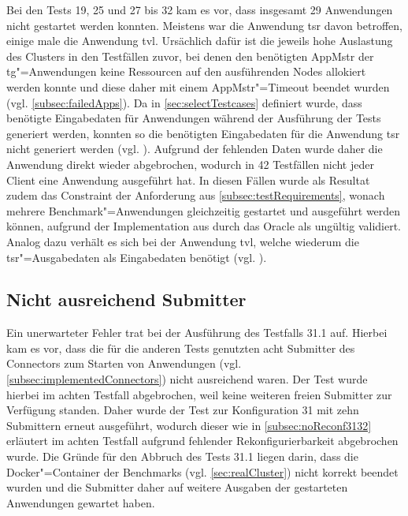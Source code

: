 Bei den Tests 19, 25 und 27 bis 32 kam es vor, dass insgesamt 29 Anwendungen nicht gestartet werden konnten.
Meistens war die Anwendung \acl{tsr} davon betroffen, einige male die Anwendung \acl{tvl}.
Ursächlich dafür ist die jeweils hohe Auslastung des Clusters in den Testfällen zuvor, bei denen den benötigten \ac{AppMstr} der \acl{tg}"=Anwendungen keine Ressourcen auf den ausführenden Nodes allokiert werden konnte und diese daher mit einem \ac{AppMstr}"=Timeout beendet wurden (vgl. \autoref{subsec:failedApps}).
Da in \autoref{sec:selectTestcases} definiert wurde, dass benötigte Eingabedaten für Anwendungen während der Ausführung der Tests generiert werden, konnten so die benötigten Eingabedaten für die Anwendung \acl{tsr} nicht generiert werden (vgl. ).
Aufgrund der fehlenden Daten wurde daher die Anwendung direkt wieder abgebrochen, wodurch in 42 Testfällen nicht jeder Client eine Anwendung ausgeführt hat.
In diesen Fällen wurde als Resultat zudem das Constraint der Anforderung aus \autoref{subsec:testRequirements}, wonach mehrere Benchmark"=Anwendungen gleichzeitig gestartet und ausgeführt werden können, aufgrund der Implementation aus  durch das Oracle als ungültig validiert.
Analog dazu verhält es sich bei der Anwendung \acl{tvl}, welche wiederum die \acl{tsr}"=Ausgabedaten als Eingabedaten benötigt (vgl. ).

\subsection{Nicht ausreichend Submitter}
\label{subsec:notEnoughSubmitter}

Ein unerwarteter Fehler trat bei der Ausführung des Testfalls 31.1 auf.
Hierbei kam es vor, dass die für die anderen Tests genutzten acht Submitter des Connectors zum Starten von Anwendungen (vgl. \autoref{subsec:implementedConnectors}) nicht ausreichend waren.
Der Test wurde hierbei im achten Testfall abgebrochen, weil keine weiteren freien Submitter zur Verfügung standen.
Daher wurde der Test zur Konfiguration 31 mit zehn Submittern erneut ausgeführt, wodurch dieser wie in \autoref{subsec:noReconf3132} erläutert im achten Testfall aufgrund fehlender Rekonfigurierbarkeit abgebrochen wurde.
Die Gründe für den Abbruch des Tests 31.1 liegen darin, dass die Docker"=Container der Benchmarks (vgl. \autoref{sec:realCluster}) nicht korrekt beendet wurden und die Submitter daher auf weitere Ausgaben der gestarteten Anwendungen gewartet haben.

